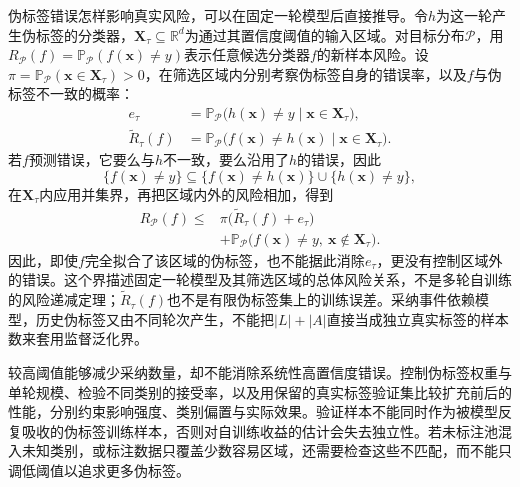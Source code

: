 伪标签错误怎样影响真实风险，可以在固定一轮模型后直接推导。令$h$为这一轮产生伪标签的分类器，$\bm{X}_\tau\subseteq\mathbb{R}^{d}$为通过其置信度阈值的输入区域。对目标分布$\mathcal{P}$，用$R_{\mathcal{P}}(f)=\mathbb{P}_{\mathcal{P}}(f(\bm{x})\ne y)$表示任意候选分类器$f$的新样本风险。设$\pi=\mathbb{P}_{\mathcal{P}}(\bm{x}\in\bm{X}_\tau)>0$，在筛选区域内分别考察伪标签自身的错误率，以及$f$与伪标签不一致的概率：
\begin{equation}
  \label{eq:classification-self-training-conditional-risks}
  \begin{aligned}
    e_\tau
      &=\mathbb{P}_{\mathcal{P}}
        \bigl(h(\bm{x})\ne y\mid\bm{x}\in\bm{X}_\tau\bigr),\\
    \widetilde R_\tau(f)
      &=\mathbb{P}_{\mathcal{P}}
        \bigl(f(\bm{x})\ne h(\bm{x})\mid\bm{x}\in\bm{X}_\tau\bigr).
  \end{aligned}
\end{equation}
若$f$预测错误，它要么与$h$不一致，要么沿用了$h$的错误，因此
\begin{equation}
  \label{eq:classification-self-training-error-events}
  \{f(\bm{x})\ne y\}
    \subseteq
    \{f(\bm{x})\ne h(\bm{x})\}
    \cup\{h(\bm{x})\ne y\},
\end{equation}
在$\bm{X}_\tau$内应用并集界，再把区域内外的风险相加，得到
\begin{equation}
  \label{eq:classification-self-training-risk}
  \begin{aligned}
    R_{\mathcal{P}}(f)
      \leq{}&\pi\bigl(\widetilde R_\tau(f)+e_\tau\bigr)\\
      &+\mathbb{P}_{\mathcal{P}}
        \bigl(f(\bm{x})\ne y,\ \bm{x}\notin\bm{X}_\tau\bigr).
  \end{aligned}
\end{equation}
因此，即使$f$完全拟合了该区域的伪标签，也不能据此消除$e_\tau$，更没有控制区域外的错误。这个界描述固定一轮模型及其筛选区域的总体风险关系，不是多轮自训练的风险递减定理；$\widetilde R_\tau(f)$也不是有限伪标签集上的训练误差。采纳事件依赖模型，历史伪标签又由不同轮次产生，不能把$|L|+|A|$直接当成独立真实标签的样本数来套用监督泛化界。

较高阈值能够减少采纳数量，却不能消除系统性高置信度错误。控制伪标签权重与单轮规模、检验不同类别的接受率，以及用保留的真实标签验证集比较扩充前后的性能，分别约束影响强度、类别偏置与实际效果。验证样本不能同时作为被模型反复吸收的伪标签训练样本，否则对自训练收益的估计会失去独立性。若未标注池混入未知类别，或标注数据只覆盖少数容易区域，还需要检查这些不匹配，而不能只调低阈值以追求更多伪标签。

